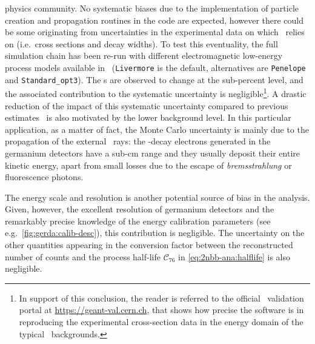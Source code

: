 \begin{description}[wide]
    physics community. No systematic biases due to the implementation of particle creation
    and propagation routines in the code are expected, however there could be some
    originating from uncertainties in the experimental data on which \geant\ relies on
    (i.e.~cross sections and decay widths). To test this eventuality, the full simulation
    chain has been re-run with different electromagnetic low-energy process models
    available in \geant\ (\texttt{Livermore} is the default, alternatives are
    \texttt{Penelope} and \texttt{Standard\_opt3}). The \pdf{}s are observed to change at the
    sub-percent level, and the associated contribution to the systematic uncertainty is
    negligible\footnote{%
      In support of this conclusion, the reader is referred to the official \geant\
      validation portal at \url{https://geant-val.cern.ch}, that shows how precise the
      software is in reproducing the experimental cross-section data in the energy domain
      of the typical \gerda\ backgrounds.
    }. A drastic reduction of the impact of this systematic uncertainty compared to
    previous estimates~\cite{Agostini2012a} is also motivated by the lower background
    level. In this particular application, as a matter of fact, the Monte Carlo
    uncertainty is mainly due to the propagation of the external \g\ rays: the \nnbb-decay
    electrons generated in the germanium detectors have a sub-cm range and they usually
    deposit their entire kinetic energy, apart from small losses due to the escape of
    \emph{bremsstrahlung} or fluorescence photons.

  \item[Other sources] The energy scale and resolution is another potential source of
    bias in the analysis. Given, however, the excellent resolution of germanium detectors
    and the remarkably precise knowledge of the energy calibration parameters (see
    e.g.~\cref{fig:gerda:calib-desc}), this contribution is negligible. The uncertainty on
    the other quantities appearing in the conversion factor between the reconstructed
    number of counts and the process half-life $\mathcal{C}_{76}$ in
    \cref{eq:2nbb-ana:halflife} is also negligible.

\end{description}

